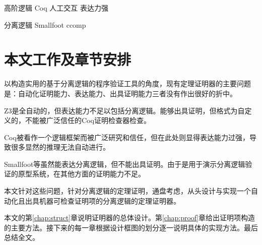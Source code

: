 高阶逻辑 Coq 人工交互 表达力强

分离逻辑 Smallfoot ccomp

\section{本文工作及章节安排}
以构造实用的基于分离逻辑的程序验证工具的角度，现有定理证明器的主要问题是：自动化证明能力、表达能力、出具证明能力三者没有作出很好的折中。

Z3是全自动的，但表达能力不足以包括分离逻辑。能够出具证明，但格式为自定义的，不能被广泛信任的Coq证明检查器检查。

Coq被看作一个逻辑框架而被广泛研究和信任，但在此处则显得表达能力过强，导致很多显然的推理无法自动进行。

Smallfoot等虽然能表达分离逻辑，但不能出具证明。由于是用于演示分离逻辑验证的原型系统，在其他方面的证明能力不足。

本文针对这些问题，针对分离逻辑的定理证明，通盘考虑，从头设计与实现一个自动化且出具机器可检查证明项的分离逻辑的定理证明器。

本文的第\ref{chap:struct}章说明证明器的总体设计。第\ref{chap:proof}章给出证明项构造的主要方法。接下来的每一章根据设计框图的划分逐一说明具体的实现方法。最后总结全文。
